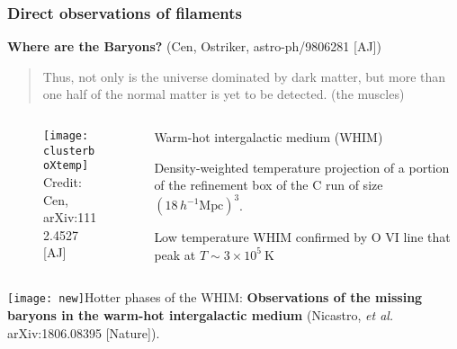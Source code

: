 \begin{frame}
  \frametitle{Direct observations of filaments}
  \small
  \textbf{Where are the Baryons?} (Cen, Ostriker, astro-ph/9806281 [AJ])
  \begin{quote}
   \scriptsize Thus, not only is the universe dominated by dark matter, but more than one half of the normal matter is yet to be detected. (the muscles)
  \end{quote}

  \vspace{-0.5cm}

\begin{columns}
  \begin{column}{0.48\textwidth}
\begin{figure}
  \centering
  \texttt{[image: clusterboXtemp]}\\
  {\tiny Credit: Cen, arXiv:1112.4527 [AJ]}
\end{figure}

  \end{column}
  \begin{column}{0.48\textwidth}
    \scriptsize
    Warm-hot intergalactic medium (WHIM)

    Density-weighted temperature projection of a portion of the refinement box of the C run of size  $\left(18\,h^{-1}\text{Mpc} \right)^3$.

    Low temperature WHIM confirmed by O VI line that peak at $T\sim 3\times 10^5\ \text{K}$
  \end{column}
\end{columns}

\small   
\texttt{[image: new]}Hotter phases of the WHIM: \textbf{  Observations of the missing baryons in the warm-hot intergalactic medium}
  (Nicastro, \emph{et al.} arXiv:1806.08395 [Nature]). 

\end{frame}
  
